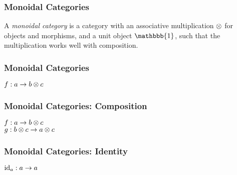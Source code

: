 \begin{frame}
    \frametitle{Monoidal Categories}

    A \textit{monoidal category} is a category with an associative multiplication $\otimes$ for objects and morphisms, and a unit object $\mathbbb{1}$, such that the multiplication works well with composition. \newline

\end{frame}


%         


\begin{frame}
    \frametitle{Monoidal Categories}

    \begin{center}
        $f: a \to b \otimes c$ \\ \vspace{0.5em}
        
    \end{center}
\end{frame}

\begin{frame}
    \frametitle{Monoidal Categories: Composition}

    \begin{center}
        $f: a \to b \otimes c$ \\
        $g: b \otimes c \to a \otimes c$ \\ \vspace{0.5em}

    \end{center}
\end{frame}


\begin{frame}
    \frametitle{Monoidal Categories: Identity}

    \begin{center}
        $\operatorname{id}_a: a \to a$ \\ \vspace{0.5em}
        
    \end{center}
\end{frame}

